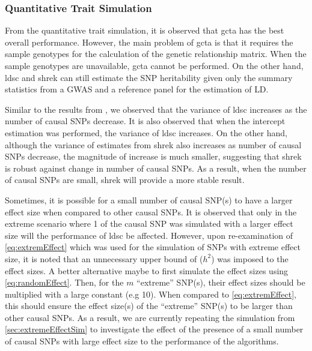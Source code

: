 	\subsubsection{Quantitative Trait Simulation}
	From the quantitative trait simulation, it is observed that \gls{gcta} has the best overall performance. 
	However, the main problem of \gls{gcta} is that it requires the sample genotypes for the calculation of the genetic relationship matrix.
	When the sample genotypes are unavailable, \gls{gcta} cannot be performed. 
	On the other hand, \gls{ldsc} and \gls{shrek} can still estimate the \gls{SNP} heritability given only the summary statistics from a \gls{GWAS} and a reference panel for the estimation of \gls{LD}.
	
	Similar to the results from \citet{Bulik-Sullivan2015}, we observed that the variance of \gls{ldsc} increases as the number of causal \glspl{SNP} decrease. 
	It is also observed that when the intercept estimation was performed, the variance of \gls{ldsc} increases.
	On the other hand, although the variance of estimates from \gls{shrek} also increases as number of causal \glspl{SNP} decrease, the magnitude of increase is much smaller, suggesting that \gls{shrek} is robust against change in number of causal \glspl{SNP}.
	As a result, when the number of causal \glspl{SNP} are small, \gls{shrek} will provide a more stable result.
	
	Sometimes, it is possible for a small number of causal \gls{SNP}(s) to have a larger effect size when compared to other causal \glspl{SNP}.
	It is observed that only in the extreme scenario where 1 of the causal \gls{SNP} was simulated with a larger effect size will the performance of \gls{ldsc} be affected.
	However, upon re-examination of \cref{eq:extremEffect} which was used for the simulation of \glspl{SNP} with extreme effect size, it is noted that an unnecessary upper bound of ($h^2$) was imposed to the effect sizes.
	A better alternative maybe to first simulate the effect sizes using \cref{eq:randomEffect}.
	Then, for the $m$ ``extreme'' \gls{SNP}(s), their effect sizes should be multiplied with a large constant (e.g 10).
	When compared to \cref{eq:extremEffect}, this should ensure the effect size(s) of the ``extreme'' \gls{SNP}(s) to be larger than other causal \glspl{SNP}.
	As a result, we are currently repeating the simulation from \cref{sec:extremeEffectSim} to investigate the effect of the presence of a small number of causal \glspl{SNP} with large effect size to the performance of the algorithms.
	
